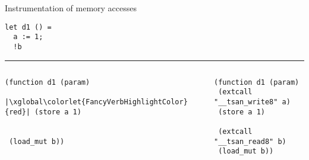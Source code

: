 \begin{frame}[fragile]{Instrumentation of memory accesses}
  \begin{verbatim}
let d1 () =
  a := 1;
  !b
  \end{verbatim}
  \par\noindent\rule{\textwidth}{0.4pt}
  \begin{columns}[T]
    \begin{column}{0.45\textwidth}
      \begin{verbatim}
(function d1 (param)

|\xglobal\colorlet{FancyVerbHighlightColor}{red}| (store a 1)


 (load_mut b))
      \end{verbatim}
    \end{column}
    \begin{column}{0.55\textwidth}
      \begin{overprint}
      \begin{verbatim}
(function d1 (param)
 (extcall "__tsan_write8" a)
 (store a 1)

 (extcall "__tsan_read8" b)
 (load_mut b))
      \end{verbatim}
      \end{overprint}
    \end{column}
  \end{columns}
\end{frame}


